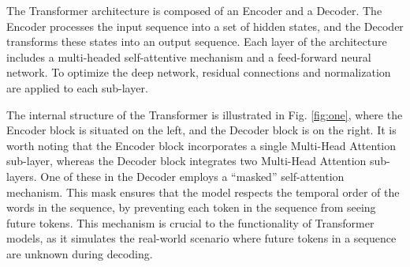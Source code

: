 \documentclass[acmsmall]{acmart}
\begin{document}
The Transformer architecture is composed of an Encoder and a Decoder. The Encoder processes the input sequence into a set of hidden states, and the Decoder transforms these states into an output sequence. Each layer of the architecture includes a multi-headed self-attentive mechanism and a feed-forward neural network. To optimize the deep network, residual connections and normalization are applied to each sub-layer.

The internal structure of the Transformer is illustrated in Fig. \ref{fig:one}, where the Encoder block is situated on the left, and the Decoder block is on the right. It is worth noting that the Encoder block incorporates a single Multi-Head Attention sub-layer, whereas the Decoder block integrates two Multi-Head Attention sub-layers. One of these in the Decoder employs a ``masked'' self-attention mechanism. This mask ensures that the model respects the temporal order of the words in the sequence, by preventing each token in the sequence from seeing future tokens. This mechanism is crucial to the functionality of Transformer models, as it simulates the real-world scenario where future tokens in a sequence are unknown during decoding.


%
\end{document}
